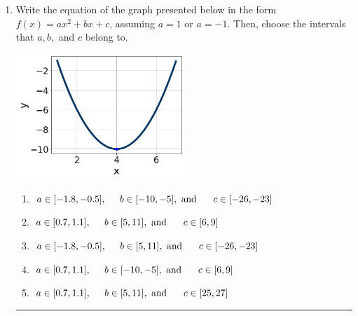 \documentclass[14pt]{extbook}
\newcommand{\litem}[1]{\item#1\hspace*{-1cm}\rule{\textwidth}{0.4pt}}
\begin{document}
\begin{enumerate}
{\begin{enumerate}[label=\Alph*.]
\end{enumerate} }
\litem{
Write the equation of the graph presented below in the form $f(x)=ax^2+bx+c$, assuming  $a=1$ or $a=-1$. Then, choose the intervals that $a, b,$ and $c$ belong to.
\begin{center}
    \includegraphics[width=0.5\textwidth]{../Figures/quadraticGraphToEquationC.png}
\end{center}
\begin{enumerate}[label=\Alph*.]
\item \( a \in [-1.8, -0.5], \hspace*{5mm} b \in [-10, -5], \text{ and } \hspace*{5mm} c \in [-26, -23] \)
\item \( a \in [0.7, 1.1], \hspace*{5mm} b \in [5, 11], \text{ and } \hspace*{5mm} c \in [6, 9] \)
\item \( a \in [-1.8, -0.5], \hspace*{5mm} b \in [5, 11], \text{ and } \hspace*{5mm} c \in [-26, -23] \)
\item \( a \in [0.7, 1.1], \hspace*{5mm} b \in [-10, -5], \text{ and } \hspace*{5mm} c \in [6, 9] \)
\item \( a \in [0.7, 1.1], \hspace*{5mm} b \in [5, 11], \text{ and } \hspace*{5mm} c \in [25, 27] \)


\end{enumerate}}
\end{enumerate}
\end{document}
